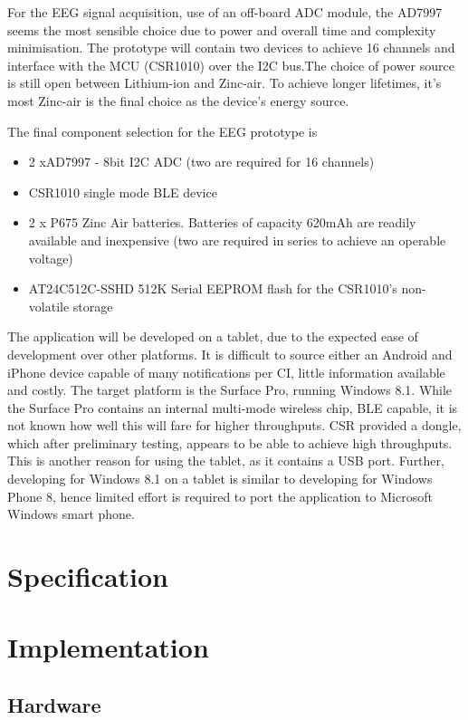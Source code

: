 \documentclass[]{article}
\begin{document}
For the \ac{EEG} signal acquisition, use of an off-board \ac{ADC} module, the AD7997 seems the most sensible choice due to power and overall time and complexity minimisation. The prototype will contain two devices to achieve 16 channels and interface with the \ac{MCU} (CSR1010) over the I2C bus.The choice of power source is still open between Lithium-ion and Zinc-air. To achieve longer lifetimes, it's most Zinc-air is the final choice as the device's energy source.

The final component selection for the \ac{EEG} prototype is
\begin{itemize}
\item 2 xAD7997 - 8bit I2C ADC (two are required for 16 channels)
\item CSR1010 single mode BLE device
\item 2 x P675 Zinc Air batteries. Batteries of capacity 620mAh are readily available and inexpensive (two are required in series to achieve an operable voltage)
\item AT24C512C-SSHD 512K Serial EEPROM flash for the CSR1010's non-volatile storage
\end{itemize}

The application will be developed on a tablet, due to the expected ease of development over other platforms. It is difficult to source either an Android and iPhone device capable of many notifications per \ac{CI}, little information available and costly. The target platform is the Surface Pro, running Windows 8.1. While the Surface Pro contains an internal multi-mode wireless chip, \ac{BLE} capable, it is not known how well this will fare for higher throughputs. \ac{CSR} provided a dongle, which after preliminary testing, appears to be able to achieve high throughputs. This is another reason for using the tablet, as it contains a \ac{USB} port. Further, developing for Windows 8.1 on a tablet is similar to developing for Windows Phone 8, hence limited effort is required to port the application to Microsoft Windows smart phone.


\clearpage
\section{Specification}
\clearpage
\section{Implementation}

\subsection{Hardware}
\end{document}
